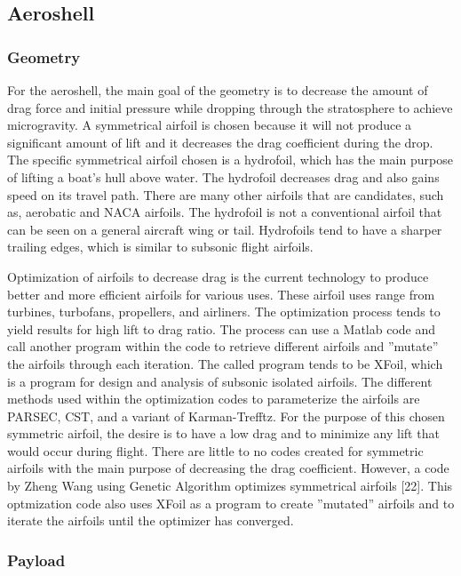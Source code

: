 \subsection{Aeroshell}

\subsubsection{Geometry}

\indent\indent For the aeroshell, the main goal of the geometry is to decrease the amount of drag force and initial pressure while dropping through the stratosphere to achieve microgravity. A symmetrical airfoil is chosen because it will not produce a significant amount of lift and it decreases the drag coefficient during the drop. The specific symmetrical airfoil chosen is a hydrofoil, which has the main purpose of lifting a boat’s hull above water. The hydrofoil decreases drag and also gains speed on its travel path. There are many other airfoils that are candidates, such as, aerobatic and NACA airfoils. The hydrofoil is not a conventional airfoil that can be seen on a general aircraft wing or tail. Hydrofoils tend to have a sharper trailing edges, which is similar to subsonic flight airfoils.

\indent Optimization of airfoils to decrease drag is the current technology to produce better and more efficient airfoils for various uses. These airfoil uses range from turbines, turbofans, propellers, and airliners. The optimization process tends to yield results for high lift to drag ratio. The process can use a Matlab code and call another program within the code to retrieve different airfoils and ”mutate” the airfoils through each iteration. The called program tends to be XFoil, which is a program for design and analysis of subsonic isolated airfoils. The different methods used within the optimization codes to parameterize the airfoils are PARSEC, CST, and a variant of Karman-Trefftz. For the purpose of this chosen symmetric airfoil, the desire is to have a low drag and to minimize any lift that would occur during flight. There are little to no codes created for symmetric airfoils with the main purpose of decreasing the drag coefficient. However, a code by Zheng Wang using Genetic Algorithm optimizes symmetrical airfoils [22]. This optmization code also uses XFoil as a program to create ”mutated” airfoils and to iterate the airfoils until the optimizer has converged.

\subsubsection{Payload}

